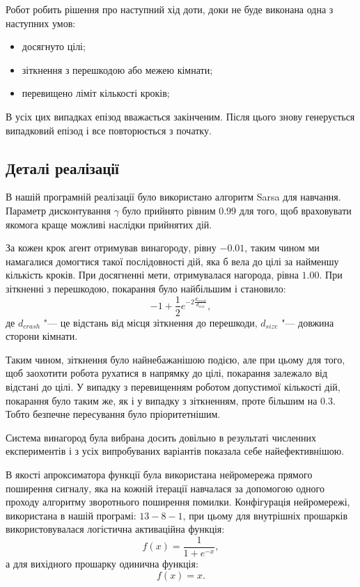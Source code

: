 Робот робить рішення про наступний хід доти, доки не буде виконана одна з наступних умов:
\begin{itemize}
	\item досягнуто цілі;
    \item зіткнення з перешкодою або межею кімнати;
	\item перевищено ліміт кількості кроків;
\end{itemize}

В усіх цих випадках епізод вважається закінченим. Після цього знову генерується випадковий епізод і все повторюється з початку.

\subsection{Деталі реалізації}

В нашій програмній реалізації було використано алгоритм Sarsa для навчання. Параметр дисконтування $\gamma$ було прийнято рівним $0.99$ для того, щоб враховувати якомога краще можливі наслідки прийнятих дій.

За кожен крок агент отримував винагороду, рівну $-0.01$, таким чином ми намагалися домогтися такої послідовності дій, яка б вела до цілі за найменшу кількість кроків. При досягненні мети, отримувалася нагорода, рівна $1.00$. При зіткненні з перешкодою, покарання було найбільшим і становило:
\[
    -1+ \frac{1}{2} e^{-2\frac{d_{crash}}{d_{size}}},
\]
де $d_{crash}$ "--- це відстань від місця зіткнення до перешкоди, $d_{size}$ "--- довжина сторони кімнати.

Таким чином, зіткнення було найнебажанішою подією, але при цьому для того, щоб заохотити робота рухатися в напрямку до цілі, покарання залежало від відстані до цілі. У випадку з перевищенням роботом допустимої кількості дій, покарання було таким же, як і у випадку з зіткненням, проте більшим на $0.3$. Тобто безпечне пересування було пріоритетнішим.

Система винагород була вибрана досить довільно в результаті численних експериментів і з усіх випробуваних варіантів показала себе найефективнішою.

В якості апроксиматора функції була використана нейромережа прямого поширення сигналу, яка на кожній ітерації навчалася за допомогою одного проходу алгоритму зворотнього поширення помилки. Конфігурація нейромережі, використана в нашій програмі: $13-8-1$, при цьому для внутрішніх прошарків використовувалася логістична активаційна функція:
\[
    f(x) = \frac{1}{1 + e^{-x}},
\]
а для вихідного прошарку одинична функція:
\[
    f(x) = x.
\]

